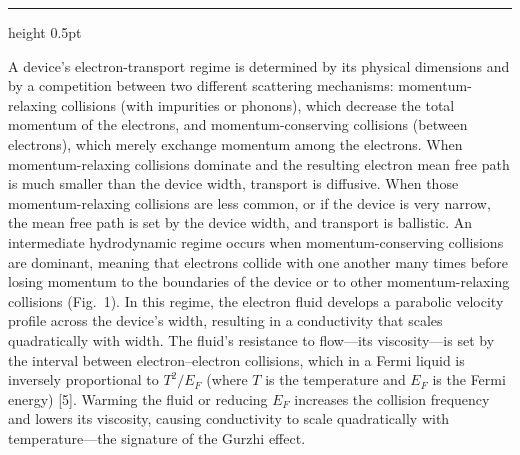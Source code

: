 \documentclass[10pt]{article}
\begin{document}
\begin{minipage}[t]{0.30\textwidth}
	 	
	{\color{Line}\hrule height 0.5pt}\par
	\vspace{3pt}
	{\fontsize{10.6}{13.3}\selectfont
	A device's electron-transport regime is determined by its physical dimensions and by a competition between two different scattering mechanisms: momentum-relaxing collisions (with impurities or phonons), which decrease the total momentum of the electrons, and momentum-conserving collisions (between electrons), which merely exchange momentum among the electrons. When momentum-relaxing collisions dominate and the resulting electron mean free path is much smaller than the device width, transport is diffusive. When those momentum-relaxing collisions are less common, or if the device is very narrow, the mean free path is set by the device width, and transport is ballistic. An intermediate hydrodynamic regime occurs when momentum-conserving collisions are dominant, meaning that electrons collide with one another many times before losing momentum to the boundaries of the device or to other momentum-relaxing collisions (Fig.~1). In this regime, the electron fluid develops a parabolic velocity profile across the device's width, resulting in a conductivity that scales quadratically with width. The fluid's resistance to flow---its viscosity---is set by the interval between electron--electron collisions, which in a Fermi liquid is inversely proportional to $T^2/E_F$ (where $T$ is the temperature and $E_F$ is the Fermi energy) [5]. Warming the fluid or reducing $E_F$ increases the collision frequency and lowers its viscosity, causing conductivity to scale quadratically with temperature---the signature of the Gurzhi effect.\par}
\end{minipage}\hfill
\end{document}
